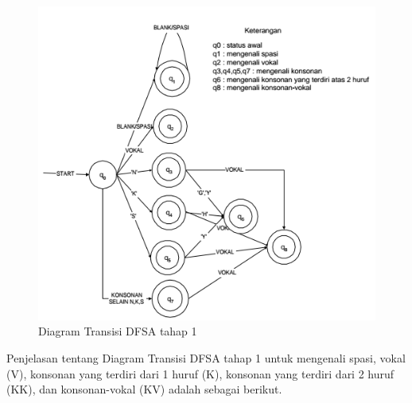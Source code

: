 \begin{figure}[H]
	\centering
	\includegraphics[scale=1.3]{Gambar/DFSA-1}
	\caption{Diagram Transisi DFSA tahap 1\cite{Thomas:2000}} 
	\label{fig:1-DFSA-1}
\end{figure}

Penjelasan tentang Diagram Transisi DFSA tahap 1 untuk mengenali spasi, vokal (V), konsonan yang terdiri dari 1 huruf (K), konsonan yang terdiri dari 2 huruf (KK), dan konsonan-vokal (KV) adalah sebagai berikut.

